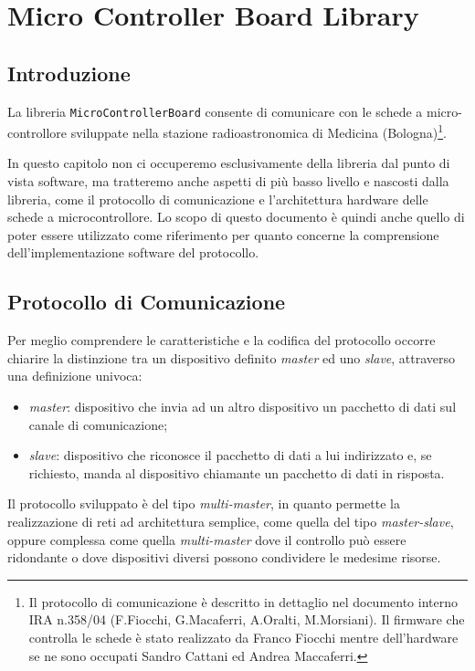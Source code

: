 \chapter{Micro Controller Board Library}

\section{Introduzione}

La libreria \texttt{MicroControllerBoard} consente di comunicare con le schede a micro-controllore
sviluppate nella stazione radioastronomica di Medicina (Bologna)\footnote{Il protocollo di comunicazione 
\`e descritto in dettaglio nel documento interno IRA n.358/04 (F.Fiocchi, G.Macaferri, A.Oralti, M.Morsiani). 
Il firmware che controlla le schede \`e stato realizzato da Franco Fiocchi mentre dell'hardware se ne sono 
occupati Sandro Cattani ed Andrea Maccaferri.}.

In questo capitolo non ci occuperemo esclusivamente della libreria dal punto di vista software,
ma tratteremo anche aspetti di pi\`u basso livello e nascosti dalla libreria,  come il protocollo di comunicazione e l'architettura
hardware delle schede a microcontrollore. Lo scopo di questo documento \`e quindi anche quello di poter essere utilizzato
come riferimento per quanto concerne la comprensione dell'implementazione software del protocollo.


\section{Protocollo di Comunicazione\label{sec:protocollo}}
Per meglio comprendere le caratteristiche e la codifica del protocollo occorre chiarire la distinzione tra
un dispositivo definito \emph{master} ed uno \emph{slave}, attraverso una definizione univoca:
\begin{itemize}
\item \emph{master}: dispositivo che invia ad un altro dispositivo un pacchetto di dati sul canale di comunicazione;
\item \emph{slave}: dispositivo che riconosce il pacchetto di dati a lui indirizzato e, se richiesto, manda
al dispositivo chiamante un pacchetto di dati in risposta.
\end{itemize}
Il protocollo sviluppato \`e del tipo \emph{multi-master}, in quanto permette la realizzazione di reti ad
architettura semplice, come quella del tipo \emph{master-slave}, oppure complessa come quella \emph{multi-master}
dove il controllo pu\`o essere ridondante o dove dispositivi diversi possono condividere le medesime risorse.

